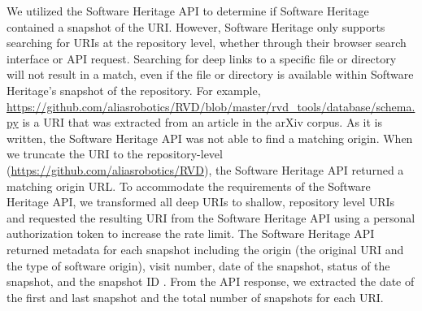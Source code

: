 We utilized the Software Heritage API \cite{swh-api} %
to determine if Software Heritage contained a snapshot of the URI. However, Software Heritage only supports searching for URIs at the repository level, whether through their browser search interface or API request. Searching for deep links to a specific file or directory will not result in a match, even if the file or directory is available within Software Heritage's snapshot of the repository. For example, \url{https://github.com/aliasrobotics/RVD/blob/master/rvd\_tools/database/schema.py} is a URI that was extracted from an article in the arXiv corpus. As it is written, the Software Heritage API was not able to find a matching origin. When we truncate the URI to the repository-level (\url{https://github.com/aliasrobotics/RVD}), the Software Heritage API returned a matching origin URL. To accommodate the requirements of the Software Heritage API, we transformed all deep URIs to shallow, repository level URIs and requested the resulting URI from the Software Heritage API using a personal authorization token to increase the rate limit. The Software Heritage API returned metadata for each snapshot including the origin (the original URI and the type of software origin), visit number, date of the snapshot, status of the snapshot, and the snapshot ID \cite{dicosmo-ipres2017}. From the API response, we extracted the date of the first and last snapshot and the total number of snapshots for each URI. 





